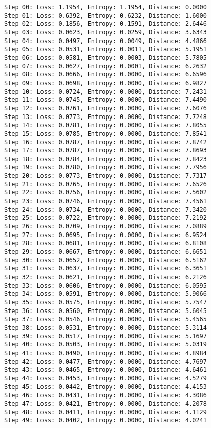 \documentclass[11pt]{article}
\begin{document}
    \begin{Verbatim}[commandchars=\\\{\}]
Step 00: Loss: 1.1954, Entropy: 1.1954, Distance: 0.0000
Step 01: Loss: 0.6392, Entropy: 0.6232, Distance: 1.6000
Step 02: Loss: 0.1856, Entropy: 0.1591, Distance: 2.6446
Step 03: Loss: 0.0623, Entropy: 0.0259, Distance: 3.6343
Step 04: Loss: 0.0497, Entropy: 0.0049, Distance: 4.4866
Step 05: Loss: 0.0531, Entropy: 0.0011, Distance: 5.1951
Step 06: Loss: 0.0581, Entropy: 0.0003, Distance: 5.7805
Step 07: Loss: 0.0627, Entropy: 0.0001, Distance: 6.2632
Step 08: Loss: 0.0666, Entropy: 0.0000, Distance: 6.6596
Step 09: Loss: 0.0698, Entropy: 0.0000, Distance: 6.9827
Step 10: Loss: 0.0724, Entropy: 0.0000, Distance: 7.2431
Step 11: Loss: 0.0745, Entropy: 0.0000, Distance: 7.4490
Step 12: Loss: 0.0761, Entropy: 0.0000, Distance: 7.6076
Step 13: Loss: 0.0773, Entropy: 0.0000, Distance: 7.7248
Step 14: Loss: 0.0781, Entropy: 0.0000, Distance: 7.8055
Step 15: Loss: 0.0785, Entropy: 0.0000, Distance: 7.8541
Step 16: Loss: 0.0787, Entropy: 0.0000, Distance: 7.8742
Step 17: Loss: 0.0787, Entropy: 0.0000, Distance: 7.8693
Step 18: Loss: 0.0784, Entropy: 0.0000, Distance: 7.8423
Step 19: Loss: 0.0780, Entropy: 0.0000, Distance: 7.7956
Step 20: Loss: 0.0773, Entropy: 0.0000, Distance: 7.7317
Step 21: Loss: 0.0765, Entropy: 0.0000, Distance: 7.6526
Step 22: Loss: 0.0756, Entropy: 0.0000, Distance: 7.5602
Step 23: Loss: 0.0746, Entropy: 0.0000, Distance: 7.4561
Step 24: Loss: 0.0734, Entropy: 0.0000, Distance: 7.3420
Step 25: Loss: 0.0722, Entropy: 0.0000, Distance: 7.2192
Step 26: Loss: 0.0709, Entropy: 0.0000, Distance: 7.0889
Step 27: Loss: 0.0695, Entropy: 0.0000, Distance: 6.9524
Step 28: Loss: 0.0681, Entropy: 0.0000, Distance: 6.8108
Step 29: Loss: 0.0667, Entropy: 0.0000, Distance: 6.6651
Step 30: Loss: 0.0652, Entropy: 0.0000, Distance: 6.5162
Step 31: Loss: 0.0637, Entropy: 0.0000, Distance: 6.3651
Step 32: Loss: 0.0621, Entropy: 0.0000, Distance: 6.2126
Step 33: Loss: 0.0606, Entropy: 0.0000, Distance: 6.0595
Step 34: Loss: 0.0591, Entropy: 0.0000, Distance: 5.9066
Step 35: Loss: 0.0575, Entropy: 0.0000, Distance: 5.7547
Step 36: Loss: 0.0560, Entropy: 0.0000, Distance: 5.6045
Step 37: Loss: 0.0546, Entropy: 0.0000, Distance: 5.4565
Step 38: Loss: 0.0531, Entropy: 0.0000, Distance: 5.3114
Step 39: Loss: 0.0517, Entropy: 0.0000, Distance: 5.1697
Step 40: Loss: 0.0503, Entropy: 0.0000, Distance: 5.0319
Step 41: Loss: 0.0490, Entropy: 0.0000, Distance: 4.8984
Step 42: Loss: 0.0477, Entropy: 0.0000, Distance: 4.7697
Step 43: Loss: 0.0465, Entropy: 0.0000, Distance: 4.6461
Step 44: Loss: 0.0453, Entropy: 0.0000, Distance: 4.5279
Step 45: Loss: 0.0442, Entropy: 0.0000, Distance: 4.4153
Step 46: Loss: 0.0431, Entropy: 0.0000, Distance: 4.3086
Step 47: Loss: 0.0421, Entropy: 0.0000, Distance: 4.2078
Step 48: Loss: 0.0411, Entropy: 0.0000, Distance: 4.1129
Step 49: Loss: 0.0402, Entropy: 0.0000, Distance: 4.0241
    \end{Verbatim}
\end{document}
